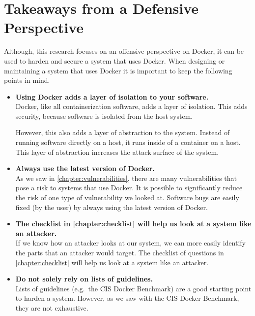 \pagebreak

\section{Takeaways from a Defensive Perspective}
Although, this research focuses on an offensive perspective on Docker, it can be used to harden and secure a system that uses Docker. When designing or maintaining a system that uses Docker it is important to keep the following points in mind.
\begin{itemize}
    \item \textbf{Using Docker adds a layer of isolation to your software.}\\
        Docker, like all containerization software, adds a layer of isolation. This adds security, because software is isolated from the host system.

    However, this also adds a layer of abstraction to the system. Instead of running software directly on a host, it runs inside of a container on a host. This layer of abstraction increases the attack surface of the system.

    \item \textbf{Always use the latest version of Docker.}\\
        As we saw in \autoref{chapter:vulnerabilities}, there are many vulnerabilities that pose a risk to systems that use Docker. It is possible to significantly reduce the risk of one type of vulnerability we looked at. Software bugs are easily fixed (by the user) by always using the latest version of Docker.

    \item \textbf{The checklist in \autoref{chapter:checklist} will help us look at a system like an attacker.}\\
        If we know how an attacker looks at our system, we can more easily identify the parts that an attacker would target. The checklist of questions in \autoref{chapter:checklist} will help us look at a system like an attacker.

    \item \textbf{Do not solely rely on lists of guidelines.}\\
        Lists of guidelines (e.g.\ the CIS Docker Benchmark) are a good starting point to harden a system. However, as we saw with the CIS Docker Benchmark, they are not exhaustive.
\end{itemize}
